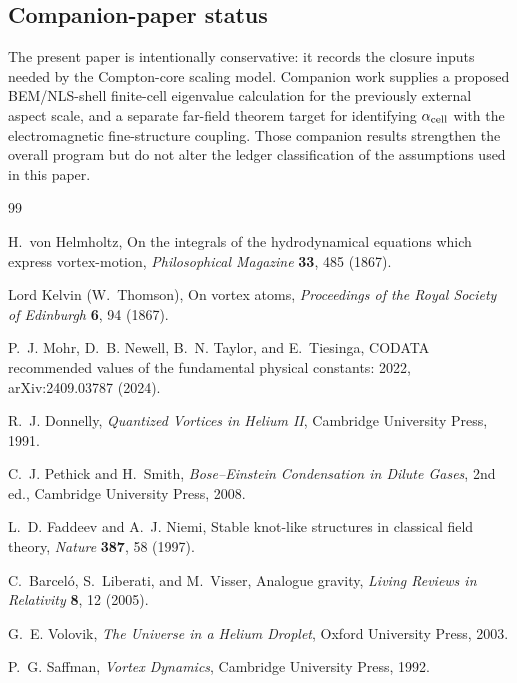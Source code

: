 \documentclass[aps,pra,preprint,longbibliography,nofootinbib]{revtex4-2}
\begin{document}

\subsection*{Companion-paper status}
The present paper is intentionally conservative: it records the closure inputs
needed by the Compton-core scaling model.  Companion work supplies a proposed
BEM/NLS-shell finite-cell eigenvalue calculation for the previously external
aspect scale, and a separate far-field theorem target for identifying
\(\alpha_{\rm cell}\) with the electromagnetic fine-structure coupling.  Those
companion results strengthen the overall program but do not alter the ledger
classification of the assumptions used in this paper.

\begin{thebibliography}{99}

H.~von Helmholtz,
On the integrals of the hydrodynamical equations which express
vortex-motion,
\textit{Philosophical Magazine} \textbf{33}, 485 (1867).

Lord Kelvin (W.~Thomson),
On vortex atoms,
\textit{Proceedings of the Royal Society of Edinburgh} \textbf{6},
94 (1867).

P.~J. Mohr, D.~B. Newell, B.~N. Taylor, and E.~Tiesinga,
CODATA recommended values of the fundamental physical constants: 2022,
arXiv:2409.03787 (2024).

R.~J. Donnelly,
\textit{Quantized Vortices in Helium II},
Cambridge University Press, 1991.

C.~J. Pethick and H.~Smith,
\textit{Bose--Einstein Condensation in Dilute Gases}, 2nd ed.,
Cambridge University Press, 2008.

L.~D. Faddeev and A.~J. Niemi,
Stable knot-like structures in classical field theory,
\textit{Nature} \textbf{387}, 58 (1997).

C.~Barcel\'o, S.~Liberati, and M.~Visser,
Analogue gravity,
\textit{Living Reviews in Relativity} \textbf{8}, 12 (2005).

G.~E. Volovik,
\textit{The Universe in a Helium Droplet},
Oxford University Press, 2003.

P.~G. Saffman,
\textit{Vortex Dynamics},
Cambridge University Press, 1992.


\end{thebibliography}
\end{document}
